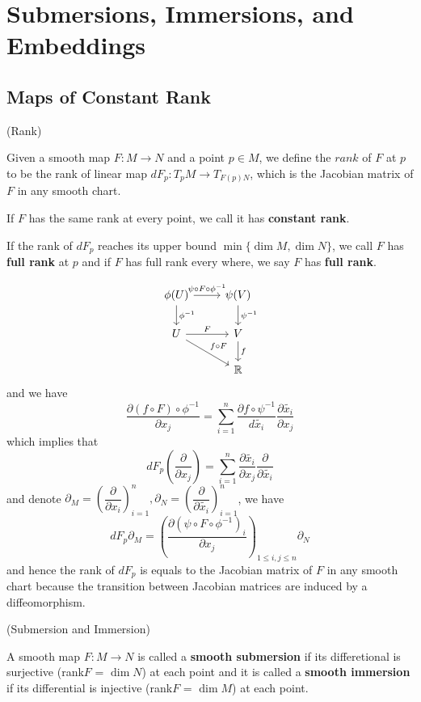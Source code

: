 \section{Submersions, Immersions, and Embeddings}

\subsection{Maps of Constant Rank}

\begin{definition}(Rank)\par
    Given a smooth map $F:M\to N$ and a point $p\in M$, we define the $rank$ of $F$ at $p$ to be the rank of linear map $dF_p:T_pM \to T_{F(p)N}$, which is the Jacobian matrix of $F$ in any smooth chart.\par
    If $F$ has the same rank at every point, we call it has \textbf{constant rank}.\par
    If the rank of $dF_p$ reaches its upper bound $\min\{\dim M,\dim N\}$, we call $F$ has \textbf{full rank} at $p$ and if $F$ has full rank every where, we say $F$ has \textbf{full rank}.
\end{definition}
\Pf\par
    \[
    \begin{tikzcd}
        \phi(U)\arrow[d,"\phi^{-1}"]\arrow[r,"\psi\circ F \circ \phi^{-1}"]& \psi(V)\arrow[d,"\psi^{-1}"]  \\
        U\arrow[r,"F"]\arrow[rd,"f\circ F"] & V\arrow[d,"f"] \\ 
         & \mathbb{R}
    \end{tikzcd}
    \]
    and we have
    \[
    \dfrac{\partial (f\circ F)\circ \phi^{-1}}{\partial{x_j}} = 
    \sum\limits_{i=1}^n \dfrac{\partial f\circ\psi^{-1}}{d\tilde{x_i}}\dfrac{\partial \tilde{x_i}}{\partial x_j}
    \]
    which implies that
    \[
    dF_p\left(\dfrac{\partial}{\partial x_j}\right) = \sum\limits_{i=1}^n \dfrac{\partial \tilde{x_i}}{\partial x_j} \dfrac{\partial }{\partial \tilde{x_i}}
    \]
    and denote $\partial_M = \left(\dfrac{\partial}{\partial x_i}\right)_{i=1}^n, \partial_N = \left(\dfrac{\partial}{\partial \tilde{x_i}}\right)_{i=1}^n$, we have
    \[
    dF_p \partial_M = \left(\dfrac{\partial (\psi\circ F\circ \phi^{-1})_i}{\partial x_j}\right)_{1\leq i,j\leq n}\partial_N
    \]
    and hence the rank of $dF_p$ is equals to the Jacobian matrix of $F$ in any smooth chart because the transition between Jacobian matrices are induced by a diffeomorphism.

\begin{definition}(Submersion and Immersion)\par
    A smooth map $F:M\to N$ is called a \textbf{smooth submersion} if its differetional is surjective (rank$F$ = $\dim N$) at each point and it is called a \textbf{smooth immersion} if its differential is injective (rank$F$ = $\dim M$) at each point.
\end{definition}

